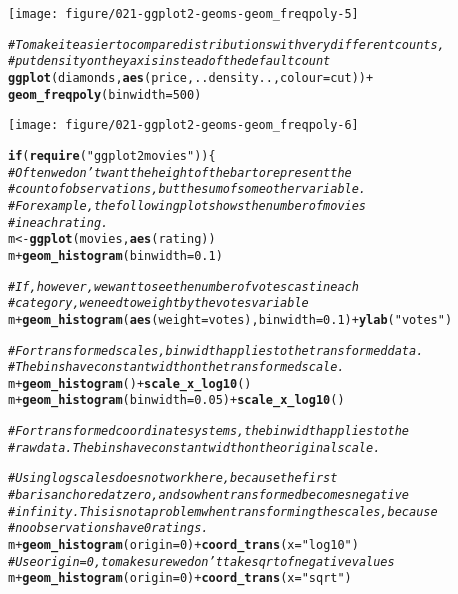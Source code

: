 \documentclass[a4paper,titlepage]{tufte-handout}\usepackage[]{graphicx}\usepackage[]{color}
\makeatletter
\def\maxwidth{ %
  \ifdim\Gin@nat@width>\linewidth
    \linewidth
  \else
    \Gin@nat@width
  \fi
}
\newcommand{\hlnum}[1]{\textcolor[rgb]{0.686,0.059,0.569}{#1}}%
\newcommand{\hlstr}[1]{\textcolor[rgb]{0.192,0.494,0.8}{#1}}%
\newcommand{\hlcom}[1]{\textcolor[rgb]{0.678,0.584,0.686}{\textit{#1}}}%
\newcommand{\hlopt}[1]{\textcolor[rgb]{0,0,0}{#1}}%
\newcommand{\hlstd}[1]{\textcolor[rgb]{0.345,0.345,0.345}{#1}}%
\newcommand{\hlkwa}[1]{\textcolor[rgb]{0.161,0.373,0.58}{\textbf{#1}}}%
\newcommand{\hlkwb}[1]{\textcolor[rgb]{0.69,0.353,0.396}{#1}}%
\newcommand{\hlkwc}[1]{\textcolor[rgb]{0.333,0.667,0.333}{#1}}%
\newcommand{\hlkwd}[1]{\textcolor[rgb]{0.737,0.353,0.396}{\textbf{#1}}}%
\newenvironment{kframe}{%
 \def\at@end@of@kframe{}%
 \ifinner\ifhmode%
  \def\at@end@of@kframe{\end{minipage}}%
  \begin{minipage}{\columnwidth}%
 \fi\fi%
 \def\FrameCommand##1{\hskip\@totalleftmargin \hskip-\fboxsep
 \colorbox{shadecolor}{##1}\hskip-\fboxsep
     \hskip-\linewidth \hskip-\@totalleftmargin \hskip\columnwidth}%
 \MakeFramed {\advance\hsize-\width
   \@totalleftmargin\z@ \linewidth\hsize
   \@setminipage}}%
 {\par\unskip\endMakeFramed%
 \at@end@of@kframe}
\newenvironment{knitrout}{}{} %
\makeatother
\begin{document}
\begin{knitrout}
\begin{kframe}
\begin{alltt}
\end{alltt}
\end{kframe}
\texttt{[image: figure/021-ggplot2-geoms-geom\_freqpoly-5]} 
\begin{kframe}\begin{alltt}
\hlcom{# To make it easier to compare distributions with very different counts,}
\hlcom{# put density on the y axis instead of the default count}
\hlkwd{ggplot}\hlstd{(diamonds,} \hlkwd{aes}\hlstd{(price, ..density..,} \hlkwc{colour} \hlstd{= cut))} \hlopt{+}
  \hlkwd{geom_freqpoly}\hlstd{(}\hlkwc{binwidth} \hlstd{=} \hlnum{500}\hlstd{)}
\end{alltt}
\end{kframe}
\texttt{[image: figure/021-ggplot2-geoms-geom\_freqpoly-6]} 
\begin{kframe}\begin{alltt}
\hlkwa{if} \hlstd{(}\hlkwd{require}\hlstd{(}\hlstr{"ggplot2movies"}\hlstd{)) \{}
\hlcom{# Often we don't want the height of the bar to represent the}
\hlcom{# count of observations, but the sum of some other variable.}
\hlcom{# For example, the following plot shows the number of movies}
\hlcom{# in each rating.}
\hlstd{m} \hlkwb{<-} \hlkwd{ggplot}\hlstd{(movies,} \hlkwd{aes}\hlstd{(rating))}
\hlstd{m} \hlopt{+} \hlkwd{geom_histogram}\hlstd{(}\hlkwc{binwidth} \hlstd{=} \hlnum{0.1}\hlstd{)}

\hlcom{# If, however, we want to see the number of votes cast in each}
\hlcom{# category, we need to weight by the votes variable}
\hlstd{m} \hlopt{+} \hlkwd{geom_histogram}\hlstd{(}\hlkwd{aes}\hlstd{(}\hlkwc{weight} \hlstd{= votes),} \hlkwc{binwidth} \hlstd{=} \hlnum{0.1}\hlstd{)} \hlopt{+} \hlkwd{ylab}\hlstd{(}\hlstr{"votes"}\hlstd{)}

\hlcom{# For transformed scales, binwidth applies to the transformed data.}
\hlcom{# The bins have constant width on the transformed scale.}
\hlstd{m} \hlopt{+} \hlkwd{geom_histogram}\hlstd{()} \hlopt{+} \hlkwd{scale_x_log10}\hlstd{()}
\hlstd{m} \hlopt{+} \hlkwd{geom_histogram}\hlstd{(}\hlkwc{binwidth} \hlstd{=} \hlnum{0.05}\hlstd{)} \hlopt{+} \hlkwd{scale_x_log10}\hlstd{()}

\hlcom{# For transformed coordinate systems, the binwidth applies to the}
\hlcom{# raw data. The bins have constant width on the original scale.}

\hlcom{# Using log scales does not work here, because the first}
\hlcom{# bar is anchored at zero, and so when transformed becomes negative}
\hlcom{# infinity. This is not a problem when transforming the scales, because}
\hlcom{# no observations have 0 ratings.}
\hlstd{m} \hlopt{+} \hlkwd{geom_histogram}\hlstd{(}\hlkwc{origin} \hlstd{=} \hlnum{0}\hlstd{)} \hlopt{+} \hlkwd{coord_trans}\hlstd{(}\hlkwc{x} \hlstd{=} \hlstr{"log10"}\hlstd{)}
\hlcom{# Use origin = 0, to make sure we don't take sqrt of negative values}
\hlstd{m} \hlopt{+} \hlkwd{geom_histogram}\hlstd{(}\hlkwc{origin} \hlstd{=} \hlnum{0}\hlstd{)} \hlopt{+} \hlkwd{coord_trans}\hlstd{(}\hlkwc{x} \hlstd{=} \hlstr{"sqrt"}\hlstd{)}


\end{alltt}
\end{kframe}
\end{knitrout}
\end{document}
